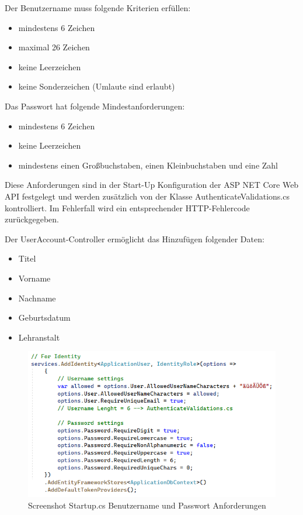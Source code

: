 Der Benutzername muss folgende Kriterien erfüllen:
\begin{itemize}
    \item mindestens 6 Zeichen
    \item maximal 26 Zeichen
    \item keine Leerzeichen
    \item keine Sonderzeichen (Umlaute sind erlaubt)
\end{itemize}

Das Passwort hat folgende Mindestanforderungen:
\begin{itemize}
    \item mindestens 6 Zeichen
    \item keine Leerzeichen
    \item mindestens einen Großbuchstaben, einen Kleinbuchstaben und eine Zahl
\end{itemize}

Diese Anforderungen sind in der Start-Up Konfiguration der ASP NET Core Web API festgelegt und werden zusätzlich von 
der Klasse AuthenticateValidations.cs kontrolliert. Im Fehlerfall wird ein entsprechender HTTP-Fehlercode zurückgegeben.

Der UserAccount-Controller ermöglicht das Hinzufügen folgender Daten:
\begin{itemize}
    \item Titel
    \item Vorname
    \item Nachname
    \item Geburtsdatum
    \item Lehranstalt
\end{itemize}

\begin{figure}[h]
    \includegraphics*[width=15cm]{./pics/screenshot_Startup_PwUserReq.png}
    \caption[PW User Requirements Startup]{Screenshot Startup.cs Benutzername und Passwort Anforderungen}
\end{figure}


